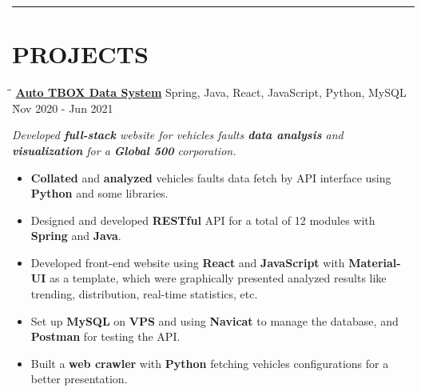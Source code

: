 \documentclass{res}
\begin{document}
\begin{resume}
\vspace{+0.05in}

\vspace{-12pt}
\hspace{-0.55in}
\noindent\rule[0.25\baselineskip]{19.36cm}{0.5pt}    
        
\vspace{-0.2in}
\section{PROJECTS}

    \vspace{-0.05in}	 
    \begin{tabbing}
    \hspace{2.391in}\= \hspace{3in}\= \kill %
    \href{https://github.com/DolorHunter/AutoTBOXDataSystem}{\bf Auto TBOX Data System}  \> 
                Spring, Java, React, JavaScript, Python, MySQL \` Nov 2020 - Jun 2021 \\
    \end{tabbing}\vspace{-20pt}      %
    \vspace{-0.13in}
    \textit{Developed {\bf full-stack} website for vehicles faults {\bf data analysis} and
             {\bf visualization} for a {\bf Global 500} corporation.}
    \vspace{-0.1in}
    \begin{itemize} \itemsep 0.5pt %
        \item {\bf Collated} and {\bf analyzed} vehicles faults data fetch by API interface using 
                {\bf Python} and some libraries.
        \item Designed and developed {\bf RESTful} API for a total of 12 modules with 
                {\bf Spring} and {\bf Java}.
        \item Developed front-end website using {\bf React} and {\bf JavaScript} with 
                {\bf Material-UI} as a template, which were graphically presented analyzed results 
                like trending, distribution, real-time statistics, etc.
        \item Set up {\bf MySQL} on {\bf VPS} and using {\bf Navicat} to manage the database, and 
                {\bf Postman} for testing the API.
        \item Built a {\bf web crawler} with {\bf Python} fetching vehicles configurations for 
                a better presentation.
    \end{itemize}


\end{resume}
\end{document}
